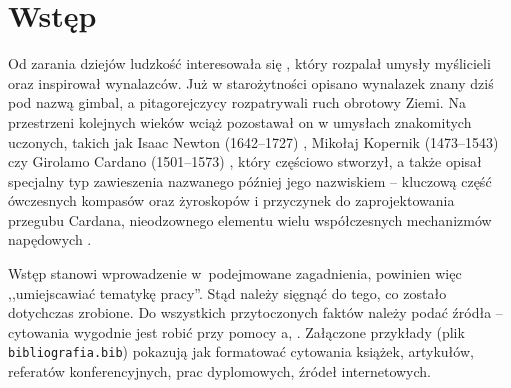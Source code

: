 \chapter{Wstęp}
\label{wstep}

Od zarania dziejów ludzkość interesowała się , który rozpalał umysły myślicieli oraz inspirował wynalazców. Już w starożytności opisano wynalazek znany dziś pod nazwą gimbal, a pitagorejczycy rozpatrywali ruch obrotowy Ziemi. Na przestrzeni kolejnych wieków wciąż pozostawał on w umysłach znakomitych uczonych, takich jak Isaac Newton (1642--1727) \cite{newton}, Mikołaj Kopernik (1473--1543) \cite{copernicus1965revolutionibus} czy Girolamo Cardano (1501--1573) \cite{cardano}, który częściowo stworzył, a także opisał specjalny typ zawieszenia nazwanego później jego nazwiskiem -- kluczową część ówczesnych kompasów oraz żyroskopów i przyczynek do zaprojektowania przegubu Cardana, nieodzownego elementu wielu współczesnych mechanizmów napędowych \cite{przegCard}.

{\red
  Wstęp stanowi wprowadzenie w~podejmowane zagadnienia, powinien więc ,,umiejscawiać tematykę pracy''. Stąd należy sięgnąć do tego, co zostało dotychczas zrobione. Do wszystkich przytoczonych faktów należy podać źródła -- cytowania wygodnie jest robić przy pomocy \BibTeX{}a, \cite{bibtex,wikibibtex}. Załączone przykłady (plik \texttt{bibliografia.bib}) pokazują jak formatować cytowania książek, artykułów, referatów konferencyjnych, prac dyplomowych, źródeł internetowych.}

\noindent
[\ldots]


